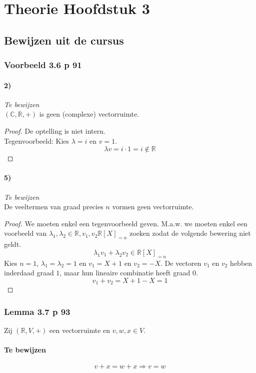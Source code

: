 \documentclass[lineaire_algebra_oplossingen.tex]{subfiles}
\begin{document}
\chapter{Theorie Hoofdstuk 3}
\section{Bewijzen uit de cursus}

\subsection{Voorbeeld 3.6 p 91}
\label{3.6}
\subsubsection*{2)}
\emph{Te bewijzen}\\
$(\mathbb{C},\mathbb{R},+)$ is geen (complexe) vectorruimte.
\begin{proof}
De optelling is niet intern.\\
Tegenvoorbeeld: Kies $\lambda = i$ en $v = 1$.
\[
\lambda v = i \cdot 1 = i \not \in \mathbb{R}
\]
\end{proof}

\subsubsection*{5)}
\emph{Te bewijzen}\\
De veeltermen van graad precies $n$ vormen geen vectorruimte.
\begin{proof}
We moeten enkel een tegenvoorbeeld geven. M.a.w. we moeten enkel een voorbeeld van $\lambda_1,\lambda_2 \in \mathbb{R}, v_1,v_2 \mathbb{R}[X]_{= n}$ zoeken zodat de volgende bewering niet geldt.
\[
\lambda_1v_1 + \lambda_2v_2 \in \mathbb{R}[X]_{= n}
\]
Kies $n=1$, $\lambda_1 = \lambda_2 = 1$ en $v_1 = X + 1$ en $v_2 = -X$. De vectoren $v_1$ en $v_2$ hebben inderdaad graad $1$, maar hun lineaire combinatie heeft graad $0$.
\[
v_1 + v_2 = X+1-X = 1
\]
\end{proof}


\subsection{Lemma 3.7 p 93}
\label{3.7}
Zij $(\mathbb{R},V,+)$ een vectorruimte en $v,w,x\in V$.
\subsubsection*{Te bewijzen}
\[
v+x = w+x \Rightarrow v=w
\]
\end{document}
